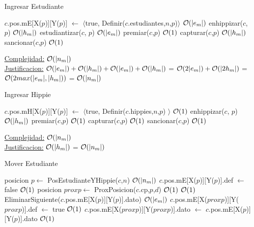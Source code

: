 \begin{Algoritmos}
\begin{algorithm}[H]
\caption{Ingresar Estudiante}
\begin{algorithmic}[1]
	\State $c$.pos.mE[X($p$)][Y($p$)] $\gets$ $\langle$true, Definir($c$.estudiantes,$n$,$p$)$\rangle$ \Comment $\mathcal{O}(|e_m|)$
	\State enhippizar($c$, $p$) \Comment $\mathcal{O}(|h_m|)$
	\State estudiantizar($c$, $p$) \Comment $\mathcal{O}(|e_m|)$
	\State premiar($c$,$p$) \Comment $\mathcal{O}(1)$
	\State capturar($c$,$p$) \Comment $\mathcal{O}(|h_m|)$
	\State sancionar($c$,$p$) \Comment $\mathcal{O}(1)$
\EndProcedure
\end{algorithmic}
\underline{Complejidad:} $\mathcal{O}(|n_m|)$\\
\underline{Justificacion:} $\mathcal{O}(|e_m|) + \mathcal{O}(|h_m|) + \mathcal{O}(|e_m|) + \mathcal{O}(|h_m|)$ =  $\mathcal{O}(2|e_m|) + \mathcal{O}(|2h_m|)$ = $\mathcal{O}(2max(|e_m|,|h_m|))$ = $\mathcal{O}(|n_m|)$
\end{algorithm}


\begin{algorithm}[H]
\caption{Ingresar Hippie}
\begin{algorithmic}[1]
	\State $c$.pos.mH[X($p$)][Y($p$)] $\gets$ $\langle$true, Definir($c$.hippies,$n$,$p$) $\rangle$ \Comment $\mathcal{O}(1)$
	\State enhippizar($c$, $p$) \Comment $\mathcal{O}(|h_m|)$
	\State premiar($c$,$p$) \Comment $\mathcal{O}(1)$
	\State capturar($c$,$p$) \Comment $\mathcal{O}(1)$
	\State sancionar($c$,$p$) \Comment $\mathcal{O}(1)$
\EndProcedure
\end{algorithmic}
\underline{Complejidad:} $\mathcal{O}(|n_m|)$ \\
\underline{Justificacion:} $\mathcal{O}(|h_m|)$ = $\mathcal{O}(|n_m|)$
\end{algorithm}

\begin{algorithm}[H]
\caption{Mover Estudiante}
\begin{algorithmic}[1]
	\State posicion $p \gets$ PosEstudianteYHippie($c$,$n$) \Comment $\mathcal{O}(|n_m|)$
	\State $c$.pos.mE[X($p$)][Y($p$)].def $\gets$ false \Comment $\mathcal{O}(1)$
	\State posicion $proxp \gets$ ProxPosicion($c$.cp,$p$,$d$) \Comment $\mathcal{O}(1)$
	 \Comment $\mathcal{O}(1)$
		\State EliminarSiguiente($c$.pos.mE[X($p$)][Y($p$)].dato) \Comment $\mathcal{O}(|e_m|)$
	\Else
		\State $c$.pos.mE[X($proxp$)][Y($proxp$)].def $\gets$ true \Comment $\mathcal{O}(1)$
		\State $c$.pos.mE[X($proxp$)][Y($proxp$)].dato $\gets$ $c$.pos.mE[X($p$)][Y($p$)].dato \Comment $\mathcal{O}(1)$
	

\end{algorithmic}
\end{algorithm}
\end{Algoritmos}
